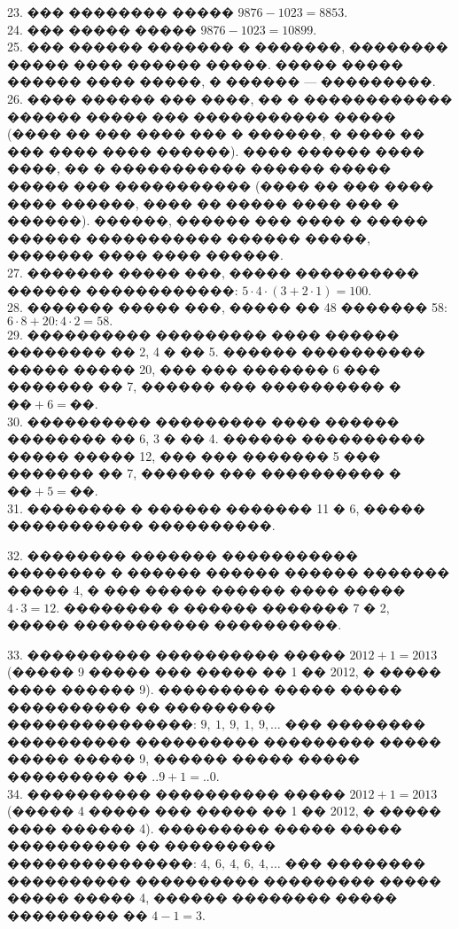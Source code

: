 \documentclass[12pt]{article}
\begin{document}
23. ��� �������� ����� $9876-1023=8853.$\\
24. ��� ����� ����� $9876-1023=10899.$\\
25. ��� ������ ������� � �������, �������� ����� ���� ������ �����. ����� ����� ������ ���� �����, � ������ --- ���������.\\
26. ���� ������ ��� ����, �� � ������������ ������ ����� ��� ����������� ����� (���� �� ��� ���� ��� � ������, � ���� �� ��� ���� ���� ������). ���� ������ ���� ����, �� � ����������� ������ ����� ����� ��� ����������� (���� �� ��� ���� ���� ������, ���� �� ����� ���� ��� � ������). ������, ������ ��� ���� � ����� ������ ����������� ������ �����, ������� ���� ���� ������.\\
27. ������� ����� ���, ����� ���������� ������ ������������: $5\cdot4\cdot(3+2\cdot1) = 100.$\\
28. ������� ����� ���, ����� �� 48 ������� 58: $6\cdot8+20:4\cdot2 = 58.$\\
29. ���������� ��������� ���� ������ �������� �� 2, 4 � �� 5. ������ ���������� ����� ����� 20, ��� ��� ������� 6 ��� ������� �� 7, ������ ��� ���������� � $\text{��}+6=\text{��}$.\\
30. ���������� ��������� ���� ������ �������� �� 6, 3 � �� 4. ������ ���������� ����� ����� 12, ��� ��� ������� 5 ��� ������� �� 7, ������ ��� ���������� � $\text{��}+5=\text{��}$.\\
31. �������� � ������ ������� 11 � 6, ����� ����������� ����������.
\begin{center}
\begin{figure}[ht!]
\end{figure}
\end{center}
32. �������� ������� ����������� �������� � ������ ������ ������ ������� ����� 4, � ��� ����� ������ ���� ����� $4\cdot3=12.$ �������� � ������ ������� 7 � 2, ����� ����������� ����������.
\begin{center}
\begin{figure}[ht!]
\end{figure}
\end{center}
33. ���������� ���������� ����� $2012+1=2013$ (����� 9 ����� ��� ����� �� 1 �� 2012, � ����� ���� ������ 9). ��������� ����� ����� ���������� �� ��������� ���������������: $9,\ 1,\ 9,\ 1,\ 9,\ldots$ ��� �������� ���������� ���������� ��������� ����� ����� ����� 9, ������ ����� ����� ��������� �� $..9+1=..0$.\\
34. ���������� ���������� ����� $2012+1=2013$ (����� 4 ����� ��� ����� �� 1 �� 2012, � ����� ���� ������ 4). ��������� ����� ����� ���������� �� ��������� ���������������: $4,\ 6,\ 4,\ 6,\ 4,\ldots$ ��� �������� ���������� ���������� ��������� ����� ����� ����� 4, ������ �������� ����� ��������� �� $4-1=3.$\\
\end{document}

